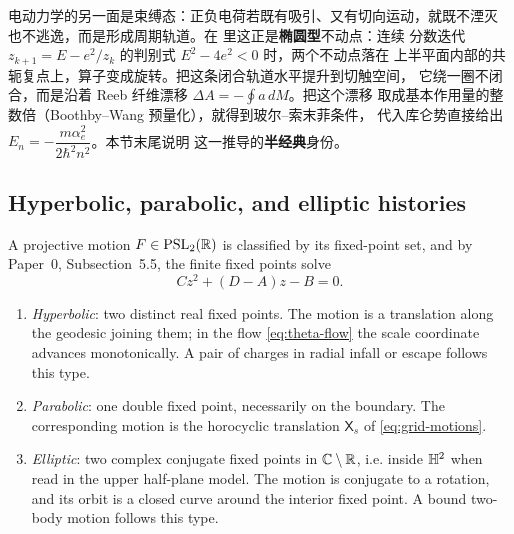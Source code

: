 
\begin{cnread}
电动力学的另一面是束缚态：正负电荷若既有吸引、又有切向运动，就既不湮灭
也不逃逸，而是形成周期轨道。在 \AEG{} 里这正是\textbf{椭圆型}不动点：连续
分数迭代 $z_{k+1}=E-e^2/z_k$ 的判别式 $E^2-4e^2<0$ 时，两个不动点落在
上半平面内部的共轭复点上，算子变成旋转。把这条闭合轨道水平提升到切触空间，
它绕一圈不闭合，而是沿着 Reeb 纤维漂移 $\Delta A=-\oint a\,dM$。把这个漂移
取成基本作用量的整数倍（Boothby--Wang 预量化），就得到玻尔--索末菲条件，
代入库仑势直接给出 $E_n=-\dfrac{m\alpha_e^2}{2\hbar^2 n^2}$。本节末尾说明
这一推导的\textbf{半经典}身份。
\end{cnread}

\subsection{Hyperbolic, parabolic, and elliptic histories}

A projective motion $F\in\operatorname{PSL}_2(\mathbb{R})$ is classified by its fixed-point set, and by
Paper~0, Subsection~5.5, the finite fixed points solve
\begin{equation}\label{eq:mobius-fixed}
  Cz^{2}+(D-A)z-B=0 .
\end{equation}

\begin{enumerate}[label=(\roman*)]
  \item \emph{Hyperbolic}: two distinct real fixed points.  The motion is a
  translation along the geodesic joining them; in the flow \eqref{eq:theta-flow}
  the scale coordinate advances monotonically.  A pair of charges in radial
  infall or escape follows this type.
  \item \emph{Parabolic}: one double fixed point, necessarily on the boundary.
  The corresponding motion is the horocyclic translation $\mathsf X_s$ of
  \eqref{eq:grid-motions}.
  \item \emph{Elliptic}: two complex conjugate fixed points in
  $\mathbb{C}\setminus\mathbb{R}$, i.e. inside $\mathbb{H}^2$ when read in the upper half-plane model.
  The motion is conjugate to a rotation, and its orbit is a closed curve around
  the interior fixed point.  A bound two-body motion follows this type.
\end{enumerate}

